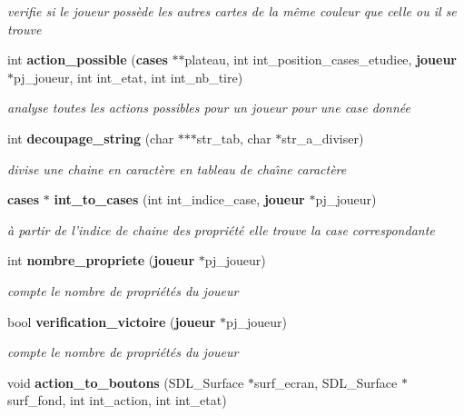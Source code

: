 \begin{CompactItemize}
\begin{CompactList}\small\item\em verifie si le joueur poss\`{e}de les autres cartes de la m\^{e}me couleur que celle ou il se trouve \item\end{CompactList}\item 
int {\bf action\_\-possible} ({\bf cases} $\ast$$\ast$plateau, int int\_\-position\_\-cases\_\-etudiee, {\bf joueur} $\ast$pj\_\-joueur, int int\_\-etat, int int\_\-nb\_\-tire)
\begin{CompactList}\small\item\em analyse toutes les actions possibles pour un joueur pour une case donn\'{e}e \item\end{CompactList}\item 
int {\bf decoupage\_\-string} (char $\ast$$\ast$$\ast$str\_\-tab, char $\ast$str\_\-a\_\-diviser)
\begin{CompactList}\small\item\em divise une chaine en caract\`{e}re en tableau de cha\^{\i}ne caract\`{e}re \item\end{CompactList}\item 
{\bf cases} $\ast$ {\bf int\_\-to\_\-cases} (int int\_\-indice\_\-case, {\bf joueur} $\ast$pj\_\-joueur)
\begin{CompactList}\small\item\em \`{a} partir de l'indice de chaine des propri\'{e}t\'{e} elle trouve la case correspondante \item\end{CompactList}\item 
int {\bf nombre\_\-propriete} ({\bf joueur} $\ast$pj\_\-joueur)
\begin{CompactList}\small\item\em compte le nombre de propri\'{e}t\'{e}s du joueur \item\end{CompactList}\item 
bool {\bf verification\_\-victoire} ({\bf joueur} $\ast$pj\_\-joueur)
\begin{CompactList}\small\item\em compte le nombre de propri\'{e}t\'{e}s du joueur \item\end{CompactList}\item 
void {\bf action\_\-to\_\-boutons} (SDL\_\-Surface $\ast$surf\_\-ecran, SDL\_\-Surface $\ast$surf\_\-fond, int int\_\-action, int int\_\-etat)
$$
\end{CompactItemize}
